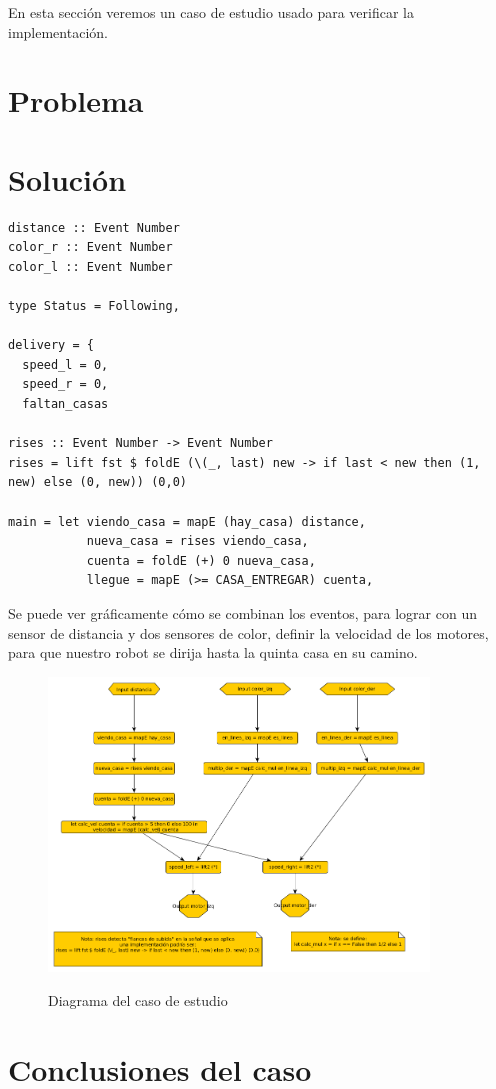 
  En esta sección veremos un caso de estudio usado para verificar la
implementación.

\section {Problema}

\section {Solución}

\begin{verbatim}
distance :: Event Number
color_r :: Event Number
color_l :: Event Number

type Status = Following, 

delivery = {
  speed_l = 0,
  speed_r = 0,
  faltan_casas

rises :: Event Number -> Event Number
rises = lift fst $ foldE (\(_, last) new -> if last < new then (1, new) else (0, new)) (0,0)

main = let viendo_casa = mapE (hay_casa) distance,
           nueva_casa = rises viendo_casa,
           cuenta = foldE (+) 0 nueva_casa,
           llegue = mapE (>= CASA_ENTREGAR) cuenta,

\end{verbatim}

Se puede ver gráficamente cómo se combinan los eventos, para lograr
con un sensor de distancia y dos sensores de color, definir la velocidad
de los motores, para que nuestro robot se dirija hasta la quinta casa en
su camino.

\begin{figure}[hbtp]
\begin{center}
\caption{Diagrama del caso de estudio}
\includegraphics[width=0.9\textwidth]{graphs/delivery.png}
\label{fig:delivery}
\end{center}
\end{figure}


\section {Conclusiones del caso}


